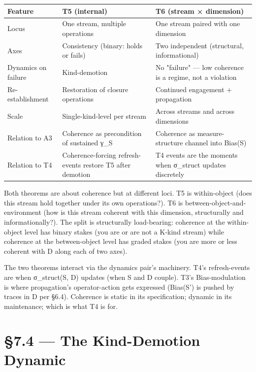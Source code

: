 \documentclass[11pt, openany]{book}
\newcommand{\sectionbreak}{\clearpage}
\begin{document}
\begingroup\setlength{\tabcolsep}{3pt}\renewcommand{\arraystretch}{1.15}\footnotesize
\begin{center}
\begin{tabular}{p{0.61in} p{1.86in} p{1.86in}}
\toprule
Feature & T5 (internal) & T6 (stream × dimension) \\
\midrule
Locus & One stream, multiple operations & One stream paired with one dimension \\
Axes & Consistency (binary: holds or fails) & Two independent (structural, informational) \\
Dynamics on failure & Kind-demotion & No "failure" --- low coherence is a regime, not a violation \\
Re-establishment & Restoration of closure operations & Continued engagement + propagation \\
Scale & Single-kind-level per stream & Across streams and across dimensions \\
Relation to A3 & Coherence as precondition of sustained γ\_\allowbreak{}S & Coherence as measure-structure channel into Bias(S) \\
Relation to T4 & Coherence-forcing refresh-events restore T5 after demotion & T4 events are the moments when σ\_\allowbreak{}struct updates discretely \\
\bottomrule
\end{tabular}
\end{center}
\endgroup
Both theorems are about coherence but at different loci. T5 is within-object (does this stream hold together under its own operations?). T6 is between-object-and-environment (how is this stream coherent with this dimension, structurally and informationally?). The split is structurally load-bearing: coherence at the within-object level has binary stakes (you are or are not a K-kind stream) while coherence at the between-object level has graded stakes (you are more or less coherent with D along each of two axes).

The two theorems interact via the dynamics pair's machinery. T4's refresh-events are when σ\_\allowbreak{}struct(S, D) updates (when S and D couple). T3's Bias-modulation is where propagation's operator-action gets expressed (Bias(S') is pushed by traces in D per §6.4). Coherence is static in its specification; dynamic in its maintenance; which is what T4 is for.

\sectionbreak

\section{§7.4 --- The Kind-Demotion Dynamic}
\end{document}
